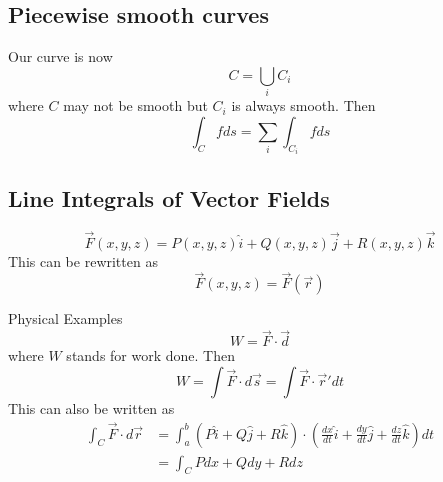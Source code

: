 \documentclass[12pt]{article}
\begin{document}
\subsection{Piecewise smooth curves}
Our curve is now
$$C = \bigcup_i C_i$$
where $C$ may not be smooth but $C_i$ is always smooth. Then
$$\int_C fds = \sum_i \int_{C_i} fds$$

\subsection{Line Integrals of Vector Fields}
$$\vec{F}(x,y,z) = P(x,y,z)\hat{i} + Q(x,y,z)\vec{j} + R(x,y,z)\vec{k}$$
This can be rewritten as
$$\vec{F}(x,y,z) = \vec{F}(\vec{r})$$

\begin{ex}
	Physical Examples
	$$W = \vec{F} \cdot \vec{d}$$
	where $W$ stands for work done. Then
	$$W = \int \vec{F} \cdot d\vec{s} = \int \vec{F} \cdot \vec{r}' dt$$
	This can also be written as
	\begin{align*}
		\int_C \vec{F} \cdot d\vec{r} &= \int_a^b (P\hat{i} + Q\hat{j} + R\hat{k}) \cdot \left(\frac{dx}{dt}\hat{i} + \frac{dy}{dt}\hat{j} + \frac{dz}{dt}\hat{k}\right)dt \\
					      &= \int_C Pdx + Qdy + Rdz
	\end{align*}
\end{ex}
\end{document}

